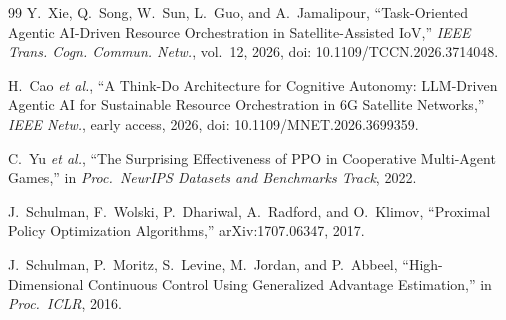 \documentclass[journal]{IEEEtran}
\begin{document}
\begin{thebibliography}{99}
Y.~Xie, Q.~Song, W.~Sun, L.~Guo, and A.~Jamalipour, ``Task-Oriented Agentic AI-Driven Resource Orchestration in Satellite-Assisted IoV,'' \emph{IEEE Trans. Cogn. Commun. Netw.}, vol.~12, 2026, doi: 10.1109/TCCN.2026.3714048.

H.~Cao \emph{et al.}, ``A Think-Do Architecture for Cognitive Autonomy: LLM-Driven Agentic AI for Sustainable Resource Orchestration in 6G Satellite Networks,'' \emph{IEEE Netw.}, early access, 2026, doi: 10.1109/MNET.2026.3699359.

C.~Yu \emph{et al.}, ``The Surprising Effectiveness of PPO in Cooperative Multi-Agent Games,'' in \emph{Proc.\ NeurIPS Datasets and Benchmarks Track}, 2022.

J.~Schulman, F.~Wolski, P.~Dhariwal, A.~Radford, and O.~Klimov, ``Proximal Policy Optimization Algorithms,'' arXiv:1707.06347, 2017.

J.~Schulman, P.~Moritz, S.~Levine, M.~Jordan, and P.~Abbeel, ``High-Dimensional Continuous Control Using Generalized Advantage Estimation,'' in \emph{Proc.\ ICLR}, 2016.

\end{thebibliography}
\end{document}
